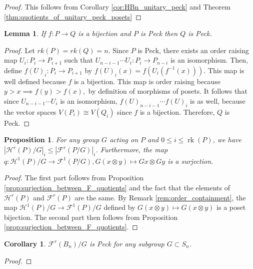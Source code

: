 \documentclass{amsart}
\newtheorem{cor}[thm]{Corollary}
\newtheorem{lem}[thm]{Lemma}
\newtheorem{prop}[thm]{Proposition}
\theoremstyle{remark}
\newcommand\rk{\operatorname{rk}}
\newcommand\fbn{\mathcal H}
\begin{document}
\begin{proof}
This follows from Corollary \ref{cor:HBn_unitary_peck} and Theorem \ref{thm:quotients_of_unitary_peck_posets}
\end{proof}

\begin{lem}
\label{lem:bijection_peck_implication}
If $f:P\rightarrow Q$ is a bijection and $P$ is Peck then $Q$ is Peck.
\end{lem}
\begin{proof}
Let $rk(P) = rk(Q) = n.$ Since $P$ is Peck, there exists an order raising map $U_i:P_i\rightarrow P_{i+1}$ such that $U_{n-i-1} \cdots U_i:P_i \rightarrow P_{n-i}$ is an isomorphism. Then, define $f(U)_i:P_i\rightarrow P_{i+1}$ by $f(U)_i(x) = f(U_i(f^{-1}(x))).$ This map is well defined because $f$ is a bijection. This map is order raising because $y > x \implies f(y) > f(x),$ by definition of morphisms of posets. It follows that since $U_{n-i-1} \cdots U_i$ is an isomorphism, $f(U)_{n-i-1} \cdots f(U)_i$ is as well, because the vector spaces $V(P_i) \cong V(Q_i)$ since $f$ is a bijection. Therefore, $Q$ is Peck.
\end{proof}

\begin{prop}
For any group $G$ acting on $P$ and $0\le i\le \rk(P)$, we have $|\mathcal{H}^r(P)/G|_i \le |\mathcal{F}^r(P/G)|_i$. Furthermore, the map $q\colon \fbn^1(P)/G\rightarrow \mathcal{F}^1(P/G),G(x\otimes y) \mapsto Gx\otimes Gy$ is a surjection.
\end{prop}

\begin{proof}
The first part follows from Proposition \ref{prop:surjection_between_F_quotients} and the fact that the elements of $\mathcal{H}^r(P)$ and $\mathcal{F}^r(P)$ are the same.  By Remark \ref{rem:order_containment}, the map $\mathcal{H}^1(P)/G\rightarrow \mathcal{F}^1(P)/G$ defined by $G(x\otimes y)\mapsto G(x\otimes y)$ is a poset bijection.  The second part then follows from Proposition \ref{prop:surjection_between_F_quotients}.
\end{proof}



\begin{cor}
\label{cor:quotiented_edge_peck}
$\mathcal{F}^r(B_n)/G$ is Peck for any subgroup $G\subset S_n$.
\end{cor}

\begin{proof}
\end{proof}
\end{document}
